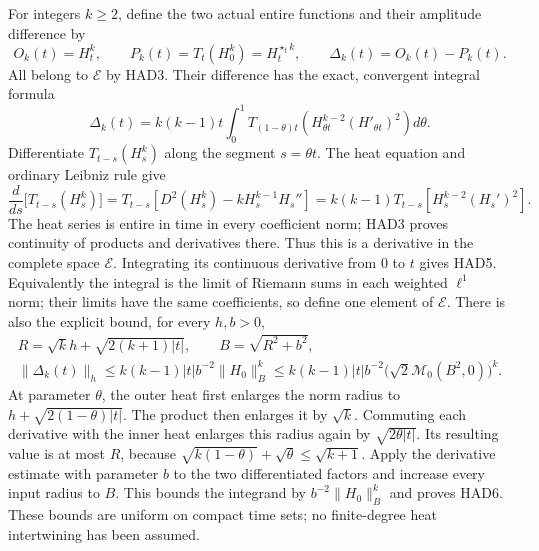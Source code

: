 For integers $k\ge2$, define the two actual entire functions
and their amplitude difference by
\begin{equation}\tag{HAD4}
 O_k(t)=H_t^k,\qquad P_k(t)=T_t(H_0^k)=H_t^{\star_t k},
 \qquad \Delta_k(t)=O_k(t)-P_k(t).
\end{equation}
All belong to $\mathcal E$ by HAD3. Their difference has the
exact, convergent integral formula
\begin{equation}\tag{HAD5}
 \boxed{\displaystyle
 \Delta_k(t)=k(k-1)t\int_0^1
 T_{(1-\theta)t}\!\left(H_{\theta t}^{k-2}(H'_{\theta t})^2\right)
                                                   d\theta.}
\end{equation}
Differentiate $T_{t-s}(H_s^k)$ along the segment $s=\theta t$.
The heat equation and ordinary Leibniz rule give
\[
 \frac{d}{ds}\bigl[T_{t-s}(H_s^k)\bigr]
 =T_{t-s}\left[D^2(H_s^k)-kH_s^{k-1}H_s''\right]
 =k(k-1)T_{t-s}\left[H_s^{k-2}(H_s')^2\right].
\]
The heat series is entire in time in every coefficient norm;
HAD3 proves continuity of products and derivatives there.
Thus this is a derivative in the complete space $\mathcal E$.
Integrating its continuous derivative from $0$ to $t$
gives HAD5. Equivalently the integral is the limit of
Riemann sums in each weighted $\ell^1$ norm; their limits
have the same coefficients, so define one element of
$\mathcal E$. There is also the explicit bound, for every
$h,b>0$,
\begin{equation}\tag{HAD6}
\begin{gathered}
 R=\sqrt k h+\sqrt{2(k+1)|t|},\qquad B=\sqrt{R^2+b^2},\\
 \|\Delta_k(t)\|_h
 \le k(k-1)|t|b^{-2}\|H_0\|_B^k
 \le k(k-1)|t|b^{-2}\bigl(\sqrt2\mathcal M_0(B^2,0)\bigr)^k.
\end{gathered}
\end{equation}
At parameter $\theta$, the outer heat first enlarges the
norm radius to $h+\sqrt{2(1-\theta)|t|}$. The product
then enlarges it by $\sqrt k$. Commuting each derivative
with the inner heat enlarges this radius again by
$\sqrt{2\theta|t|}$. Its resulting value is at most $R$,
because $\sqrt{k(1-\theta)}+\sqrt\theta\le\sqrt{k+1}$.
Apply the derivative estimate with parameter $b$ to the
two differentiated factors and increase every input
radius to $B$. This bounds the integrand by
$b^{-2}\|H_0\|_B^k$ and proves HAD6. These bounds are
uniform on compact time sets; no finite-degree heat
intertwining has been assumed.


